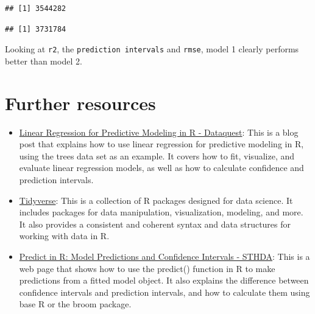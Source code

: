 \documentclass[
]{book}
\newenvironment{Shaded}{\begin{snugshade}}{\end{snugshade}}
\newcommand{\FunctionTok}[1]{\textcolor[rgb]{0.13,0.29,0.53}{\textbf{#1}}}
\newcommand{\NormalTok}[1]{#1}
\newcommand{\SpecialCharTok}[1]{\textcolor[rgb]{0.81,0.36,0.00}{\textbf{#1}}}
\providecommand{\tightlist}{%
  \setlength{\itemsep}{0pt}\setlength{\parskip}{0pt}}
\begin{document}
\begin{verbatim}
## [1] 3544282
\end{verbatim}

\begin{Shaded}
\end{Shaded}

\begin{verbatim}
## [1] 3731784
\end{verbatim}

Looking at \texttt{r2}, the \texttt{prediction\ intervals} and \texttt{rmse}, model 1 clearly performs better than model 2.

\hypertarget{further-resources-2}{%
\section{Further resources}\label{further-resources-2}}

\begin{itemize}
\tightlist
\item
  \href{https://www.dataquest.io/blog/statistical-learning-for-predictive-modeling-r/}{Linear Regression for Predictive Modeling in R - Dataquest}: This is a blog post that explains how to use linear regression for predictive modeling in R, using the trees data set as an example. It covers how to fit, visualize, and evaluate linear regression models, as well as how to calculate confidence and prediction intervals.
\item
  \href{https://www.tidyverse.org/}{Tidyverse}: This is a collection of R packages designed for data science. It includes packages for data manipulation, visualization, modeling, and more. It also provides a consistent and coherent syntax and data structures for working with data in R.
\item
  \href{http://www.sthda.com/english/articles/40-regression-analysis/166-predict-in-r-model-predictions-and-confidence-intervals/}{Predict in R: Model Predictions and Confidence Intervals - STHDA}: This is a web page that shows how to use the predict() function in R to make predictions from a fitted model object. It also explains the difference between confidence intervals and prediction intervals, and how to calculate them using base R or the broom package.
\end{itemize}
\end{document}
